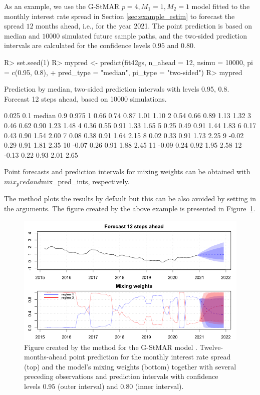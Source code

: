 \documentclass[nojss]{jss} %
\begin{document}
As an example, we use the G-StMAR $p=4, M_1=1, M_2=1$ model fitted to the monthly interest rate spread in Section \ref{sec:example_estim} to forecast the spread $12$ months ahead, i.e., for the year 2021. The point prediction is based on median and $10000$ simulated future sample paths, and the two-sided prediction intervals are calculated for the confidence levels $0.95$ and $0.80$.
%
\begin{CodeChunk}
\begin{CodeInput}
R> set.seed(1)
R> mypred <- predict(fit42gs, n_ahead = 12, nsimu = 10000, pi = c(0.95, 0.8),
+    pred_type = "median", pi_type = "two-sided")
R> mypred
\end{CodeInput}
\begin{CodeOutput}
Prediction by median, two-sided prediction intervals with levels 0.95, 0.8.
Forecast 12 steps ahead, based on 10000 simulations.

   0.025  0.1 median  0.9 0.975
1   0.66 0.74   0.87 1.01  1.10
2   0.54 0.66   0.89 1.13  1.32
3   0.46 0.62   0.90 1.23  1.48
4   0.36 0.55   0.91 1.33  1.65
5   0.25 0.49   0.91 1.44  1.83
6   0.17 0.43   0.90 1.54  2.00
7   0.08 0.38   0.91 1.64  2.15
8   0.02 0.33   0.91 1.73  2.25
9  -0.02 0.29   0.91 1.81  2.35
10 -0.07 0.26   0.91 1.88  2.45
11 -0.09 0.24   0.92 1.95  2.58
12 -0.13 0.22   0.93 2.01  2.65

 Point forecasts and prediction intervals for mixing weights can be obtained
 with $mix_pred and $mix_pred_ints, respectively.
\end{CodeOutput}
\end{CodeChunk}
%
The  method plots the results by default but this can be also avoided by setting  in the arguments. The figure created by the above example is presented in Figure~\ref{fig:predictfit42gs}.

\begin{figure}[t]
  \centering
  \includegraphics{figures/predictfit42gs.png}
  \caption{Figure created by the  method for the G-StMAR model . Twelve-months-ahead point prediction for the monthly interest rate spread (top) and the model's mixing weights (bottom) together with several preceding observations and prediction intervals with confidence levels $0.95$ (outer interval) and $0.80$ (inner interval).}
\label{fig:predictfit42gs}
\end{figure}
\end{document}

